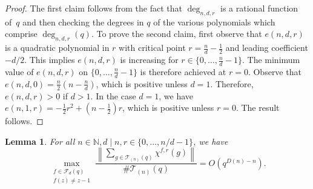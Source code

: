 \documentclass[10pt]{article}
\newtheorem{lemma}[theorem]{Lemma}
\theoremstyle{definition}
\newcommand{\CF}{\mathcal{F}}
\newcommand{\N}{\mathbb{N}}
\newcommand{\CT}{\mathcal{T}}
\begin{document}
\begin{proof}
The first claim follows from the fact that \(\deg_{n,d,r}\) is a rational function of~\(q\) and then checking the degrees in \(q\) of the various polynomials which comprise \(\deg_{n,d,r} (q)\).
To prove the second claim, first observe that \(e(n,d,r)\) is a quadratic polynomial in \(r\) with critical point \(r = \tfrac{n}{d} - \tfrac{1}{2}\) and leading coefficient \(-d/2\).
This implies \(e(n,d,r)\) is increasing for \(r \in \{0,\ldots,\tfrac{n}{d}-1\}\).
The minimum value of \(e(n,d,r)\) on \(\{0,\ldots,\tfrac{n}{d}-1\}\) is therefore achieved at \(r = 0\).
Observe that \(e(n,d,0) = \tfrac{n}{2}\left ( n - \tfrac{n}{d}\right )\), which is positive unless \(d = 1\).
Therefore, \(e(n,d,r) > 0\) if \(d > 1\).
In the case \(d = 1\), we have \(e(n,1,r) = -\tfrac{1}{2}r^2 + (n-\tfrac{1}{2})r\), which is positive unless \(r = 0\).
The result follows.
\end{proof}







\begin{lemma}
\label{helvetica_scenario}
For all \(n \in \N, d \mid n, r \in \{0,\ldots,n/d-1\}\), we have
\begin{equation}
\max_{\substack{f \in \CF_d (q) \\ f(z) \neq z-1}}
\frac{\left \| \sum_{g \in \CT_{(n)}(q)} \chi^{f,r}(g) \right \|}{\# \CT_{(n)}(q)}
=
O \left ( q^{D(n)-n} \right ).
\end{equation}
\end{lemma}
\end{document}
